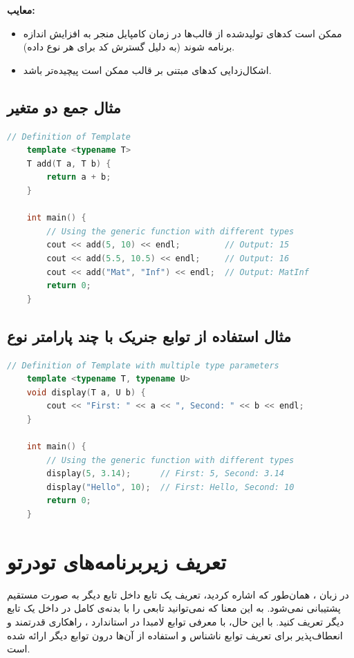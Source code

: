 \documentclass[12pt, a4paper]{report}
\begin{document}
\textbf{معایب:}
\begin{itemize}
\item ممکن است کدهای تولیدشده از قالب‌ها در زمان کامپایل منجر به افزایش اندازه برنامه شوند (به دلیل گسترش کد برای هر نوع داده).
\item اشکال‌زدایی کدهای مبتنی بر قالب ممکن است پیچیده‌تر باشد.
\end{itemize}


\subsection{مثال جمع دو متغیر}

\begin{LTR}
\begin{lstlisting}[language=C++, breaklines=true]
	// Definition of Template
	template <typename T>
	T add(T a, T b) {
		return a + b;
	}
	
	int main() {
		// Using the generic function with different types
		cout << add(5, 10) << endl;         // Output: 15
		cout << add(5.5, 10.5) << endl;     // Output: 16
		cout << add("Mat", "Inf") << endl;  // Output: MatInf
		return 0;
	}
\end{lstlisting}
\end{LTR}

\subsection{مثال استفاده از توابع جنریک با چند پارامتر نوع}

\begin{LTR}
\begin{lstlisting}[language=C++, breaklines=true]
	// Definition of Template with multiple type parameters
	template <typename T, typename U>
	void display(T a, U b) {
		cout << "First: " << a << ", Second: " << b << endl;
	}
	
	int main() {
		// Using the generic function with different types
		display(5, 3.14);  	   // First: 5, Second: 3.14
		display("Hello", 10);  // First: Hello, Second: 10
		return 0;
	}
\end{lstlisting}
\end{LTR}


\section{تعریف زیربرنامه‌های تودرتو}

در زبان ، همان‌طور که اشاره کردید، تعریف یک تابع داخل تابع دیگر به صورت مستقیم پشتیبانی نمی‌شود. به این معنا که نمی‌توانید تابعی را با بدنه‌ی کامل در داخل یک تابع دیگر تعریف کنید. با این حال، با معرفی توابع لامبدا در استاندارد ، راهکاری قدرتمند و انعطاف‌پذیر برای تعریف توابع ناشناس و استفاده از آن‌ها درون توابع دیگر ارائه شده است.
\end{document}
